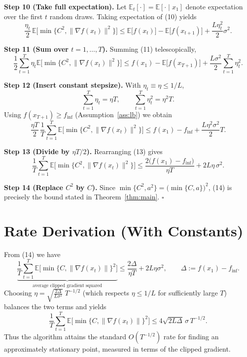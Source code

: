\documentclass{article}
\begin{document}
\noindent\textbf{Step 10 (Take full expectation).}
Let $\mathbb{E}_t[\cdot]=\mathbb{E}[\cdot\mid x_1]$ denote expectation over the
first $t$ random draws. Taking expectation of (10) yields
\[
\frac{\eta_t}{2}\,
\mathbb{E}\!\bigl[\min\{C^2,\|\nabla f(x_t)\|^2\}\bigr]
\le
\mathbb{E}\!\bigl[f(x_t)\bigr]-\mathbb{E}\!\bigl[f(x_{t+1})\bigr]
+\frac{L\eta_t^2}{2}\sigma^2 .
\tag{11}
\]

\noindent\textbf{Step 11 (Sum over $t=1,\dots,T$).}
Summing (11) telescopically,
\[
\frac{1}{2}\sum_{t=1}^{T}\eta_t
\mathbb{E}\!\bigl[\min\{C^2,\|\nabla f(x_t)\|^2\}\bigr]
\le
f(x_1)-\mathbb{E}\!\bigl[f(x_{T+1})\bigr]
+\frac{L\sigma^2}{2}\sum_{t=1}^{T}\eta_t^2 .
\tag{12}
\]

\noindent\textbf{Step 12 (Insert constant stepsize).}
With $\eta_t\equiv\eta\le 1/L$,
\[
\sum_{t=1}^{T}\eta_t = \eta T,\qquad
\sum_{t=1}^{T}\eta_t^2 = \eta^2 T .
\]
Using $f(x_{T+1})\ge f_{\inf}$ (Assumption~\ref{ass:lb}) we obtain
\[
\frac{\eta T}{2}\,
\frac{1}{T}\sum_{t=1}^{T}
\mathbb{E}\!\bigl[\min\{C^2,\|\nabla f(x_t)\|^2\}\bigr]
\le
f(x_1)-f_{\inf}
+\frac{L\eta^2\sigma^2}{2} T .
\tag{13}
\]

\noindent\textbf{Step 13 (Divide by $\eta T/2$).}
Rearranging (13) gives
\[
\frac{1}{T}\sum_{t=1}^{T}
\mathbb{E}\!\bigl[\min\{C^2,\|\nabla f(x_t)\|^2\}\bigr]
\le
\frac{2\bigl(f(x_1)-f_{\inf}\bigr)}{\eta T}
+2L\eta\,\sigma^2 .
\tag{14}
\]

\noindent\textbf{Step 14 (Replace $C^2$ by $C$).}
Since $\min\{C^2,a^2\}= \bigl(\min\{C,a\}\bigr)^2$, (14) is precisely the bound
stated in Theorem~\ref{thm:main}. \hfill $\square$

\section*{Rate Derivation (With Constants)}
From (14) we have
\[
\underbrace{\frac{1}{T}\sum_{t=1}^{T}
\mathbb{E}\!\bigl[\min\{C,\|\nabla f(x_t)\|\}^2\bigr]}_{\text{average clipped gradient squared}}
\le
\frac{2\Delta}{\eta T}+2L\eta\sigma^2,
\qquad
\Delta:=f(x_1)-f_{\inf}.
\]
Choosing $\eta = \sqrt{\frac{2\Delta}{L\sigma^2}}\;T^{-1/2}$ (which respects
$\eta\le 1/L$ for sufficiently large $T$) balances the two terms and yields
\[
\frac{1}{T}\sum_{t=1}^{T}
\mathbb{E}\!\bigl[\min\{C,\|\nabla f(x_t)\|\}^2\bigr]
\le
4\sqrt{2L\Delta}\,\sigma\, T^{-1/2}.
\]
Thus the algorithm attains the standard $O(T^{-1/2})$ rate for finding an
approximately stationary point, measured in terms of the clipped gradient.
\end{document}
